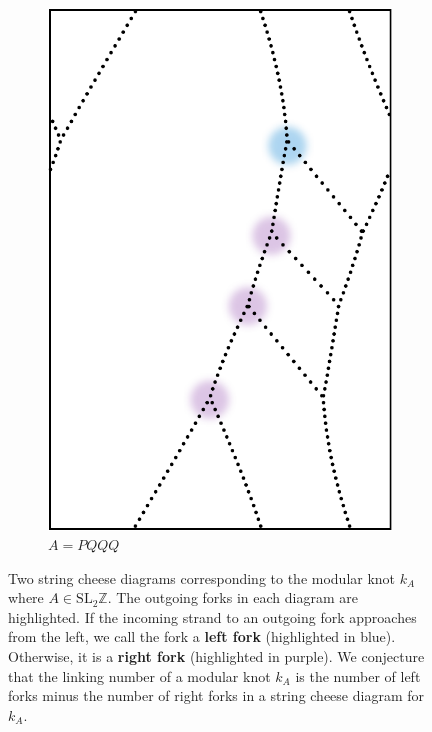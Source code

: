 \documentclass[12pt,twoside]{reedthesis}
\theoremstyle{definition}
\newcommand{\Z}{\mathbb{Z}}
\newcommand{\SLZ}{\mathrm{SL}_2{\Z}}
\newcommand{\defnphrase}[1]{\textbf{#1}}
\begin{document}
\begin{figure}[h]
\begin{subfigure}[t]{0.31\textwidth}
    \includegraphics[width=\textwidth]{figures/subset_loop_forks_pqqq.pdf}
    \caption*{$A = PQQQ$}
  \end{subfigure}
  \caption{Two string cheese diagrams corresponding to the modular knot $k_A$ where $A \in \SLZ$. The outgoing forks in each diagram are highlighted. If the incoming strand to an outgoing fork approaches from the left, we call the fork a \defnphrase{left fork} (highlighted in blue). Otherwise, it is a \defnphrase{right fork} (highlighted in purple). We conjecture that the linking number of a modular knot $k_A$ is the number of left forks minus the number of right forks in a string cheese diagram for $k_A$.}
  \label{fig:subset_loop_forks}
\end{figure}
\end{document}
